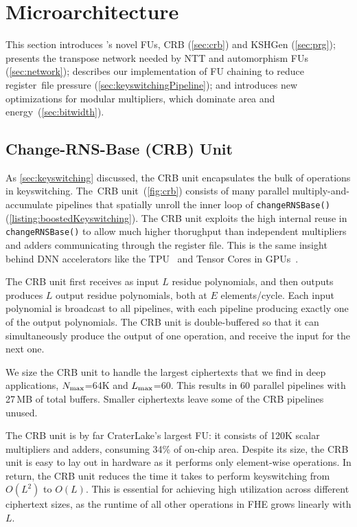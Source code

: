 \section{Microarchitecture}\label{sec:architecture}

This section introduces \name's novel FUs, CRB (\autoref{sec:crb}) and KSHGen
(\autoref{sec:prg}); presents the transpose network needed by NTT and
automorphism FUs (\autoref{sec:network}); describes our implementation of FU
chaining to reduce register~file pressure (\autoref{sec:keyswitchingPipeline});
and introduces new optimizations for modular multipliers, which dominate area
and energy~(\autoref{sec:bitwidth}).

\subsection{Change-RNS-Base (CRB) Unit}\label{sec:crb}

As \autoref{sec:keyswitching} discussed, the CRB unit encapsulates the bulk of
operations in keyswitching. The~CRB unit~(\autoref{fig:crb}) consists of many
parallel multiply-and-accumulate pipelines that spatially unroll the inner loop
of \verb!changeRNSBase()! (\autoref{listing:boostedKeyswitching}). The CRB unit
exploits the high internal reuse in \verb!changeRNSBase()! to allow much higher
thorughput than independent multipliers and adders communicating through the
register file. This is the same insight behind DNN accelerators like the
TPU~\cite{jouppi:isca17:tpu} and Tensor Cores in
GPUs~\cite{choquette2021nvidia}.

The CRB unit first receives as input $L$ residue polynomials, and then outputs
produces $L$ output residue polynomials, both at $E$ elements/cycle. Each input
polynomial is broadcast to all pipelines, with each pipeline producing exactly
one of the output polynomials. The CRB unit is double-buffered so that it can
simultaneously produce the output of one operation, and receive the input for
the next one.

We size the CRB unit to handle the largest ciphertexts that we find in deep
applications, $N_{\textrm{max}}$=64K and $L_{\textrm{max}}$=60. This results in 60 parallel pipelines
with 27\,MB of total buffers. Smaller ciphertexts leave some of the CRB
pipelines unused.

\figCRB

The CRB unit is by far CraterLake's largest FU: it consists of 120K scalar
multipliers and adders, consuming 34\% of on-chip area. Despite its size, the
CRB unit is easy to lay out in hardware as it performs only element-wise
operations. In return, the CRB unit reduces the time it takes to perform
keyswitching from $O(L^2)$ to $O(L)$. This is essential for achieving high
utilization across different ciphertext sizes, as the runtime of all other
operations in FHE grows linearly with $L$.

